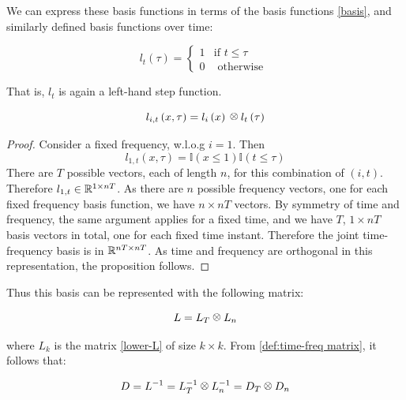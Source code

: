 \documentclass{article}
\begin{document}
We can express these basis functions in terms of the basis functions \eqref{basis}, and similarly defined basis functions over time:

\begin{equation}
l_t\left(\tau\right) =
\begin{cases}
1 & \text{if } t \leq \tau \\
0 & \text{ otherwise } 
\end{cases}
\label{time-basis}
\end{equation}

That is, \(l_t\) is again a left-hand step function. 

\begin{proposition}
\begin{equation}
l_{i,t}\left(x, \tau\right) = l_i\left(x\right) \kronecker l_t\left(\tau\right)
\end{equation}
\begin{proof}
Consider a fixed frequency, w.l.o.g \(i=1\). Then 
\begin{equation}
l_{1,t}\left(x, \tau\right) = \mathbb{I}\left(x \leq 1\right)\mathbb{I}\left(t \leq \tau \right)
\end{equation}
There are \(T\) possible vectors, each of length \(n\), for this combination of \(\left(i,t\right)\). Therefore \(l_{1,t}\in {\mathbb{R}}^{1\times nT} \). As there are \(n\) possible frequency vectors, one for each fixed frequency basis function, we have \(n\times nT\) vectors. By symmetry of time and frequency, the same argument applies for a fixed time, and we have \(T\), \(1\times nT\) basis vectors in total, one for each fixed time instant. Therefore the joint time-frequency basis is in \({\mathbb{R}}^{nT \times nT}\). As time and frequency are orthogonal in this representation, the proposition follows.
\end{proof}
\end{proposition}

Thus this basis can be represented with the following matrix:

\begin{equation}
L = L_T \kronecker L_n
\label{def:time-freq matrix}
\end{equation}

where \(L_k\) is the matrix \eqref{lower-L} of size \(k \times k\). From \eqref{def:time-freq matrix}, it follows that:

\begin{equation}
D = L^{-1} = L_T^{-1} \kronecker L_n^{-1} = D_T \kronecker D_n
\end{equation}
\end{document}
